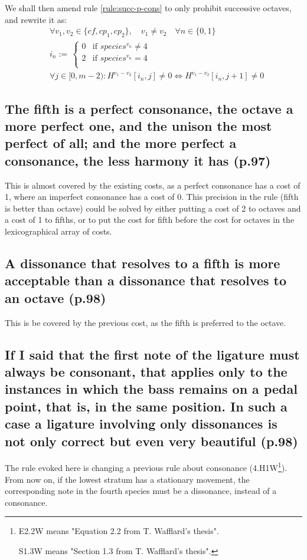 We shall then amend rule \ref{rule:succ-p-cons} to only prohibit successive octaves, and rewrite it as:
\begin{equation} \begin{aligned}
    &\forall v_1, v_2 \in \{cf, cp_1, cp_2\}, \quad v_1 \neq v_2 \quad \forall n \in \{0, 1\} \\
    &i_n := \,  
    \begin{cases}
        0 & \text{if } species^{v_n} \neq 4\\
        2 & \text{if } species^{v_n} = 4\\
    \end{cases}\\
    &\forall j \in [0, m-2) \colon H^{v_1-v_2}[i_n, j] \neq 0 \iff H^{v_1-v_2}[i_n, j+1] \neq 0
\end{aligned} \end{equation}

\subsection{The fifth is a perfect consonance, the octave a more perfect one, and the unison the most perfect of all; and the more perfect a consonance, the less harmony it has (p.97)}
This is almost covered by the existing costs, as a perfect consonance has a cost of 1, where an imperfect consonance has a cost of 0. This precision in the rule (fifth is better than octave) could be solved by either putting a cost of 2 to octaves and a cost of 1 to fifths, or to put the cost for fifth before the cost for octaves in the lexicographical array of costs.
\subsection{A dissonance that resolves to a fifth is more acceptable than a dissonance that resolves to an octave (p.98)}
This is be covered by the previous cost, as the fifth is preferred to the octave.

\subsection{If I said that the first note of the ligature must always be consonant, that applies only to the instances in which the bass remains on a pedal point, that is, in the same position. In such a case a ligature involving only dissonances is not only correct but even very beautiful (p.98)}
The rule evoked here is changing a previous rule about consonance (4.H1W\footnote{E2.2W means "Equation 2.2 from T. Wafflard's thesis".

S1.3W means "Section 1.3 from T. Wafflard's thesis".}). From now on, if the lowest stratum has a stationary movement, the corresponding note in the fourth species must be a dissonance, instead of a consonance.

